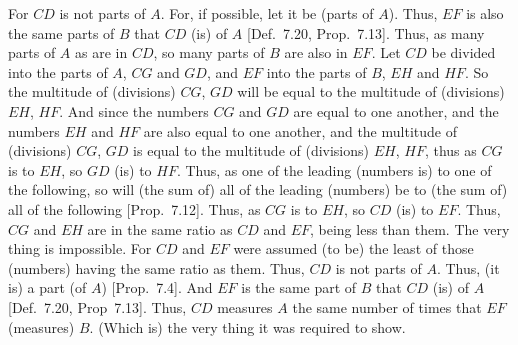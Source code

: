 \begin{Parallel}{}{}
{\epsfysize=2in
\centerline{}

For $CD$ is not parts of $A$. For, if possible, let it be (parts of $A$). Thus,
$EF$ is also the same parts of $B$ that $CD$ (is) of $A$  [Def.~7.20, Prop.~7.13]. Thus, as many parts of $A$ as
are in $CD$, so many parts of $B$ are also in $EF$.  Let $CD$ be divided into the parts of $A$, $CG$ and $GD$, and $EF$ into the
parts of $B$, $EH$ and $HF$. So the multitude of (divisions) $CG$, $GD$
will be equal to the multitude of (divisions) $EH$, $HF$. And since the
numbers $CG$ and $GD$ are equal to one another, and the numbers
$EH$ and $HF$ are also equal to one another, and the multitude of (divisions)
$CG$, $GD$ is equal to the multitude of (divisions) $EH$, $HF$, thus as $CG$ is to $EH$, so
$GD$ (is) to $HF$. Thus,  as one of the
leading (numbers is) to one of the following, so will (the sum of) all
of the leading (numbers)  be  to (the sum of) all of the following [Prop.~7.12].  Thus, as $CG$ is to $EH$,
so $CD$ (is) to $EF$. Thus, $CG$ and $EH$ are in the same ratio as
$CD$ and $EF$, being less than them. The very thing is impossible. For
$CD$ and $EF$ were assumed (to be) the least of those (numbers) having
the same ratio as them. Thus, $CD$ is not parts of $A$. Thus, (it is) a
part (of $A$) [Prop.~7.4]. And $EF$ is the same part of $B$ that $CD$ (is) of $A$ [Def.~7.20, Prop~7.13]. Thus, $CD$ measures $A$ the same number of times that $EF$ (measures) $B$. (Which is) the very thing it was required to
show.}
\end{Parallel}

